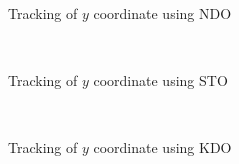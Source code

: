 \documentclass[letterpaper%
, twoside%
, 12pt%
,memoire%
, english%
,creativecommons,hyperref%
]{thETS}
\begin{document}
\begin{figure}[H]
\centering
{}
\\ \parbox{0.75\textwidth}{\caption{Tracking of $y$ coordinate using NDO}\label{y_trac_dis_m1_ndo}}
\end{figure}

\begin{figure}[H]
\centering
{}
\\ \parbox{0.75\textwidth}{\caption{Tracking of $y$ coordinate using STO}\label{y_trac_dis_m1_sto}}
\end{figure}

\begin{figure}[H]
\centering
{}
\\ \parbox{0.75\textwidth}{\caption{Tracking of $y$ coordinate using KDO}\label{y_trac_dis_m1_kdo}}
\end{figure}
\end{document}
